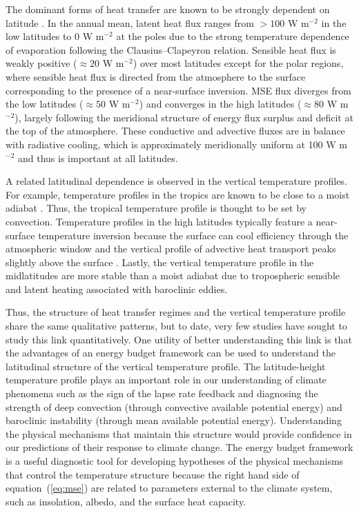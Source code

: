 \documentclass{ametsocV5}
\begin{document}
The dominant forms of heat transfer are known to be strongly dependent on latitude \citep[e.g., see Fig.~6.1 in][]{hartmann2016}. In the annual mean, latent heat flux ranges from $>100$ W m$^{-2}$ in the low latitudes to 0 W m$^{-2}$ at the poles due to the strong temperature dependence of evaporation following the Clausius--Clapeyron relation. Sensible heat flux is weakly positive ($\approx 20$ W m$^{-2}$) over most latitudes except for the polar regions, where sensible heat flux is directed from the atmosphere to the surface corresponding to the presence of a near-surface inversion. MSE flux diverges from the low latitudes ($\approx 50$ W m$^{-2}$) and converges in the high latitudes ($\approx 80$ W m$^{-2}$), largely following the meridional structure of energy flux surplus and deficit at the top of the atmosphere. These conductive and advective fluxes are in balance with radiative cooling, which is approximately meridionally uniform at 100 W m$^{-2}$ and thus is important at all latitudes.

A related latitudinal dependence is observed in the vertical temperature profiles. For example, temperature profiles in the tropics are known to be close to a moist adiabat \citep{stone1979,betts1982,xu1989,williams1993}. Thus, the tropical temperature profile is thought to be set by convection. Temperature profiles in the high latitudes typically feature a near-surface temperature inversion because the surface can cool efficiency through the atmospheric window \citep{cronin2016} and the vertical profile of advective heat transport peaks slightly above the surface \citep{oort1974, cardinale2021}. Lastly, the vertical temperature profile in the midlatitudes are more stable than a moist adiabat \citep{stone1979,korty2007} due to tropospheric sensible and latent heating associated with baroclinic eddies.

Thus, the structure of heat transfer regimes and the vertical temperature profile share the same qualitative patterns, but to date, very few studies have sought to study this link quantitatively. One utility of better understanding this link is that the advantages of an energy budget framework can be used to understand the latitudinal structure of the vertical temperature profile. The latitude-height temperature profile plays an important role in our understanding of climate phenomena such as the sign of the lapse rate feedback and diagnosing the strength of deep convection (through convective available potential energy) and baroclinic instability (through mean available potential energy). Understanding the physical mechanisms that maintain this structure would provide confidence in our predictions of their response to climate change. The energy budget framework is a useful diagnostic tool for developing hypotheses of the physical mechanisms that control the temperature structure because the right hand side of equation~(\ref{eq:mse}) are related to parameters external to the climate system, such as insolation, albedo, and the surface heat capacity.
\end{document}

